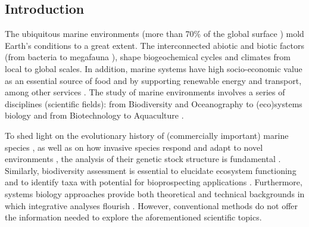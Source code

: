    \subsection{Introduction}

   The ubiquitous marine environments (more than 70\% of the global surface \citep{noaa}) 
   mold Earth's conditions to a great extent. 
   The interconnected abiotic \citep{falkowski2008microbial} and biotic factors 
   (from bacteria \citep{falkowski2008microbial} to megafauna \citep{estes2016megafaunal}), 
   shape biogeochemical cycles \citep{arrigo2005marine} and climates \citep{boero2007conceptual, beal2011role} 
   from local to global scales. 
   In addition, marine systems have high socio-economic value \citep{remoundou2009valuation} 
   as an essential source of food and by supporting renewable energy and transport, 
   among other services \citep{portner2019ocean}. 
   The study of marine environments involves a series of disciplines (scientific fields): 
   from Biodiversity \citep{sala2006global} and Oceanography to (eco)systems biology \citep{tonon2015marine} 
   and from Biotechnology \citep{dionisi2012bioprospection} to Aquaculture \citep{tidwell2001fish}.

   To shed light on the evolutionary history of (commercially important) 
   marine species \citep{carvalho1995molecular}, as well as on how invasive species respond and 
   adapt to novel environments \citep{sakai2001population}, 
   the analysis of their genetic stock structure is fundamental \citep{begg1999holistic}. 
   Similarly, biodiversity assessment is essential to elucidate ecosystem functioning \citep{loreau2000biodiversity} 
   and to identify taxa with potential for bioprospecting applications \citep{leal2012trends}. 
   Furthermore, systems biology approaches provide both theoretical and technical backgrounds 
   in which integrative analyses flourish \citep{norberg2001phenotypic}. 
   However, conventional methods do not offer the information needed to explore the 
   aforementioned scientific topics.
   

